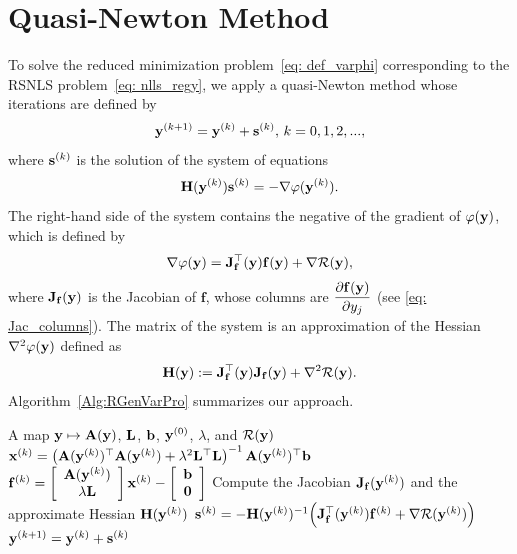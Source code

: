 \documentclass[onefignum,onetabnum]{siamart171218}
\newcommand{\bA}{{\bf A}}
\newcommand{\bH}{{\bf H}}
\newcommand{\bJ}{{\bf J}}
\newcommand{\bL}{{\bf L}}
\newcommand{\bb}{{\bf b}}
\newcommand{\bff}{{\bf f}}
\newcommand{\bs}{{\bf s}}
\newcommand{\bx}{{\bf x}}
\newcommand{\by}{{\bf y}}
\begin{document}
\section{Quasi-Newton Method}\label{section:quasi-Newton}
To solve the reduced minimization problem~\eqref{eq: def_varphi} corresponding to the RSNLS problem~\eqref{eq: nlls_regy}, we apply a quasi-Newton method whose iterations are defined by 
\begin{equation*}
\by^{(k+1)} = \by^{(k)} + \bs^{(k)}, \,k = 0,1,2,...,
\end{equation*}
where $\bs^{(k)}$ is the solution of the system of equations
\begin{equation*}
\bH(\by^{(k)})\bs^{(k)} =  -\nabla \varphi(\by^{(k)}).
\end{equation*}
The right-hand side of the system contains the negative of the gradient of $\varphi(\by)$, which is defined by
\[ \nabla \varphi(\by) = \bJ^\top_{\mathbf{f}}(\by) \mathbf{f}(\by)+ \nabla\mathcal{R}(\by),\]
where $\bJ_{\mathbf{f}}(\by)$ is the Jacobian of $\mathbf{f}$, whose columns are 
$\dfrac{\partial \bff(\by)}{\partial y_j}$ (see \eqref{eq: Jac_columns}). The matrix of the system is an approximation of the Hessian $\nabla^2 \varphi(\by)$ defined as
\begin{equation}\label{eq: approxHessian}
 \bH(\by): =\bJ^\top_{\mathbf{f}} (\by) \bJ_{\mathbf{f}}(\by) + \nabla^2 \mathcal{R}(\by).
\end{equation}
Algorithm~\ref{Alg:RGenVarPro} summarizes our approach.

\begin{algorithm}[ht]
\caption{\texttt{RGenVarPro}}
\label{Alg:RGenVarPro}
\begin{algorithmic}[1]
 A map $\by \mapsto \bA(\by)$, $\bL$, $\bb$, $\by^{(0)}$, $\lambda$, and $\mathcal{R}(\by)$ 
    \STATE $\bx^{(k)} = \left(\bA(\by^{(k)})^\top\bA(\by^{(k)})+\lambda^2 \bL^\top \bL\right)^{-1}\bA(\by^{(k)})^\top\bb$
    \STATE $\bff^{(k)} = \left[\begin{array}{c} \bA(\by^{(k)}) \\ \lambda \bL\end{array}\right] \bx^{(k)}-\left[\begin{array}{c} \bb \\ \mathbf{0} \end{array}\right]$\;
    \STATE Compute the Jacobian $\bJ_{\bff}(\by^{(k)})$ and the approximate Hessian $\bH(\by^{(k)})$\;
    \STATE $\bs^{(k)}=  -\bH(\by^{(k)})^{-1}\Big(\bJ^\top_{\mathbf{f}}(\by^{(k)}) \mathbf{f}^{(k)}+ \nabla\mathcal{R}(\by^{(k)})\Big)$\;
    \STATE $\by^{(k+1)} = \by^{(k)} + \bs^{(k)}$\;
\ENDFOR    
\end{algorithmic}
\end{algorithm}
\end{document}
